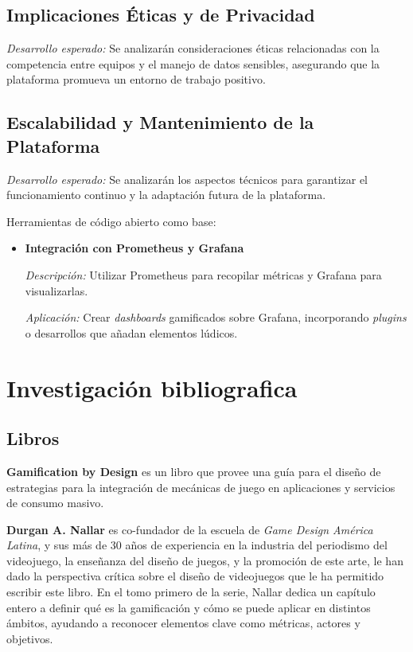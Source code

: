 \documentclass[journal]{IEEEtran}
\begin{document}
\subsection{\textbf{ Implicaciones Éticas y de Privacidad}}

\textit{Desarrollo esperado:} Se analizarán consideraciones éticas relacionadas con la competencia entre equipos y el manejo de datos sensibles, asegurando que la plataforma promueva un entorno de trabajo positivo.

\subsection{\textbf{ Escalabilidad y Mantenimiento de la Plataforma}}

\textit{Desarrollo esperado:} Se analizarán los aspectos técnicos para garantizar el funcionamiento continuo y la adaptación futura de la plataforma.

Herramientas de código abierto como base:

\begin{itemize}
    \item \textbf{Integración con Prometheus y Grafana}
    
    \textit{Descripción:} Utilizar Prometheus para recopilar métricas y Grafana para visualizarlas.
    
    \textit{Aplicación:} Crear \textit{dashboards} gamificados sobre Grafana, incorporando \textit{plugins} o desarrollos que añadan elementos lúdicos.
\end{itemize}

\section{\textbf{\Large \textbf{\Large Investigación bibliografica}}}
\subsection{\textbf{ \textbf{\large Libros}}}

\cite{zichermann2011gamification} \textbf{Gamification by Design} es un libro que provee una guía para el diseño de estrategias para la integración de mecánicas de juego en aplicaciones y servicios de consumo masivo.

\cite{nallar2015estructuraludica} \textbf{Durgan A. Nallar} es co-fundador de la escuela de \textit{Game Design América Latina}, y sus más de 30 años de experiencia en la industria del periodismo del videojuego, la enseñanza del diseño de juegos, y la promoción de este arte, le han dado la perspectiva crítica sobre el diseño de videojuegos que le ha permitido escribir este libro. En el tomo primero de la serie, Nallar dedica un capítulo entero a definir qué es la gamificación y cómo se puede aplicar en distintos ámbitos, ayudando a reconocer elementos clave como métricas, actores y objetivos.
\end{document}

